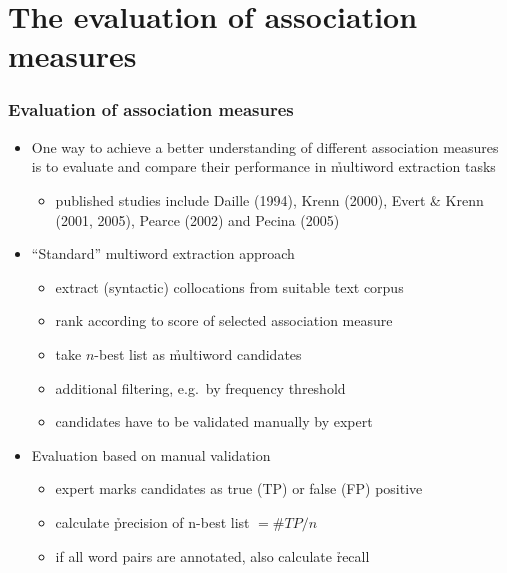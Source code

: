 \documentclass[handout,notes=show,t]{beamer} %
\begin{document}
\section{The evaluation of association measures}

\begin{frame}
  \frametitle{Evaluation of association measures}

  \begin{itemize}
  \item One way to achieve a better understanding of different association
    measures is to evaluate and compare their performance in \h{multiword
      extraction} tasks
    \begin{itemize}
    \item published studies include Daille (1994), Krenn (2000), Evert \&
      Krenn (2001, 2005), Pearce (2002) and Pecina (2005)
    \end{itemize}
    \pause
  \item ``Standard'' multiword extraction approach
    \begin{itemize}
    \item extract (syntactic) collocations from suitable text corpus
    \item rank according to score of selected association measure
    \item take $n$-best list as \h{multiword candidates}
    \item additional filtering, e.g.\ by frequency threshold
    \item candidates have to be validated manually by expert
    \end{itemize}
    \pause
  \item Evaluation based on manual validation
    \begin{itemize}
    \item expert marks candidates as true (TP) or false (FP) positive
    \item calculate \h{precision} of n-best list $= \#TP / n$
    \item if all word pairs are annotated, also calculate \h{recall}
    \end{itemize}
  \end{itemize}
\end{frame}
\end{document}
